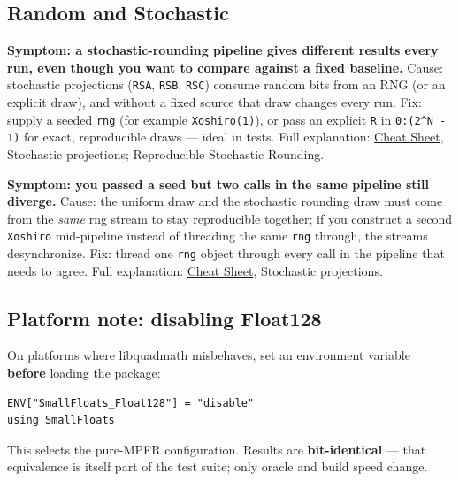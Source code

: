 \subsection{Random and Stochastic}



\label{16404060453799710041}{}


\textbf{Symptom: a stochastic-rounding pipeline gives different results every run, even though you want to compare against a fixed baseline.} Cause: stochastic projections (\texttt{RSA}, \texttt{RSB}, \texttt{RSC}) consume random bits from an RNG (or an explicit draw), and without a fixed source that draw changes every run. Fix: supply a seeded \texttt{rng} (for example \texttt{Xoshiro(1)}), or pass an explicit \texttt{R} in \texttt{0:(2{\textasciicircum}N - 1)} for exact, reproducible draws — ideal in tests. Full explanation: \href{help\_\allowbreak{}cheat\_\allowbreak{}sheet.md}{Cheat Sheet}, Stochastic projections; Reproducible Stochastic Rounding.



\textbf{Symptom: you passed a seed but two calls in the same pipeline still diverge.} Cause: the uniform draw and the stochastic rounding draw must come from the \emph{same} rng stream to stay reproducible together; if you construct a second \texttt{Xoshiro} mid-pipeline instead of threading the same \texttt{rng} through, the streams desynchronize. Fix: thread one \texttt{rng} object through every call in the pipeline that needs to agree. Full explanation: \href{help\_\allowbreak{}cheat\_\allowbreak{}sheet.md}{Cheat Sheet}, Stochastic projections.



\subsection{Platform note: disabling Float128}



\label{2993233528556244241}{}


On platforms where libquadmath misbehaves, set an environment variable \textbf{before} loading the package:




\nopagebreak[4]
\begin{verbatim}
ENV["SmallFloats_Float128"] = "disable"
using SmallFloats
\end{verbatim}



This selects the pure-MPFR configuration. Results are \textbf{bit-identical} — that equivalence is itself part of the test suite; only oracle and build speed change.



